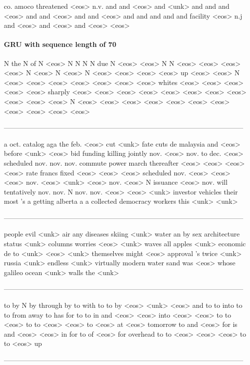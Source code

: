 \begin{enumerate}
co. amoco threatened <eos> n.v. and and <eos> and <unk> and and and <eos> and and <eos> and and <eos> and and and and and facility <eos> n.j and <eos> and <eos> and <eos> <eos>

\paragraph{GRU with sequence length of 70}
N the N of N <eos> N N N N due N <eos> <eos> N N <eos> <eos> <eos> <eos> N <eos> N <eos> N <eos> <eos> <eos> <eos> up <eos> <eos> N <eos> <eos> <eos> <eos> <eos> <eos> <eos> whites <eos> <eos> <eos> <eos> <eos> sharply <eos> <eos> <eos> <eos> <eos> <eos> <eos> <eos> <eos> <eos> <eos> N <eos> <eos> <eos> <eos> <eos> <eos> <eos> <eos> <eos> <eos> <eos>

---------------------------------------------------------------------------------------------------------

a oct. catalog aga the feb. <eos> cut <unk> fate cuts de malaysia and <eos> before <unk> <eos> bid funding killing jointly nov. <eos> nov. to dec. <eos> scheduled nov. nov. nov. commute power march thereafter <eos> <eos> <eos> <eos> rate francs fixed <eos> <eos> <eos> scheduled nov. <eos> <eos> <eos> nov. <eos> <unk> <eos> nov. <eos> N issuance <eos> nov. will tentatively nov. nov. N nov. nov. <eos> <eos>
<unk> investor vehicles their most 's a getting alberta a a collected democracy workers this <unk> <unk>

---------------------------------------------------------------------------------------------------------

people evil <unk> air any diseases skiing <unk> water an by sex architecture status <unk> columns worries <eos> <unk> waves all apples <unk> economic de to <unk> <eos> <unk> themselves might <eos> approval 's twice <unk> russia <unk> endless <unk> virtually modern water sand was <eos> whose galileo ocean <unk> walls the <unk>

---------------------------------------------------------------------------------------------------------

to by N by through by to with to to by <eos> <unk> <eos> and to to into to to from away to has for to to in and <eos> <eos> into <eos> <eos> to to <eos> to to <eos> <eos> to <eos> at <eos> tomorrow to and <eos> for is and <eos> <eos> in for to of <eos> for overhead to to <eos> <eos> <eos> to to <eos> up

---------------------------------------------------------------------------------------------------------


\end{enumerate}
